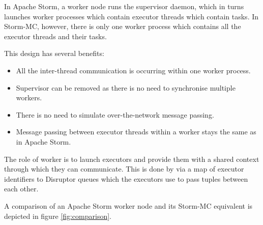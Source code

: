 In Apache Storm, a worker node runs the supervisor daemon, which in turns launches worker processes which contain executor threads which contain tasks. In Storm-MC, however, there is only one worker process which contains all the executor threads and their tasks.

This design has several benefits:

\begin{itemize}
	\item All the inter-thread communication is occurring within one worker process.
	\item Supervisor can be removed as there is no need to synchronise multiple workers.
	\item There is no need to simulate over-the-network message passing.
	\item Message passing between executor threads within a worker stays the same as in Apache Storm.
\end{itemize}

The role of worker is to launch executors and provide them with a shared context through which they can communicate. This is done by via a map of executor identifiers to Disruptor queues which the executors use to pass tuples between each other.

A comparison of an Apache Storm worker node and its Storm-MC equivalent is depicted in figure \ref{fig:comparison}.

